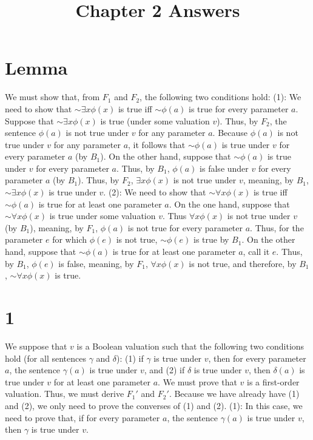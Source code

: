 \documentclass{article}
\title{Chapter 2 Answers}
\newcommand*{\oldneg}{\mathord{\sim}}
\theoremstyle{definition}
\begin{document}
\maketitle

\section*{Lemma}
We must show that, from $F_1$ and $F_2$, the following two conditions hold:\newline
(1): We need to show that $\oldneg\exists x\phi(x)$ is true iff $\oldneg\phi(a)$ is true for every parameter $a$. Suppose that $\oldneg\exists x\phi(x)$ 
is true (under some valuation $v$). Thus, by $F_2$, the sentence $\phi(a)$ is not true under $v$ for any parameter $a$. Because $\phi(a)$ is not 
true under $v$ for any parameter $a$, it follows that $\oldneg\phi(a)$ is true under $v$ for every parameter $a$ (by $B_1$). On the other hand, 
suppose that $\oldneg\phi(a)$ is true under $v$ for every parameter $a$. Thus, by $B_1$, $\phi(a)$ is false under $v$ for every parameter $a$ (by $B_1$). Thus, by $F_2$, $\exists x\phi(x)$ is not true under $v$, meaning, by $B_1$, $\oldneg\exists x\phi(x)$ is true under $v$.\newline
(2): We need to show that $\oldneg\forall x\phi(x)$ is true iff $\oldneg\phi(a)$ is true for at least one parameter $a$. On the one hand, suppose 
that $\oldneg\forall x\phi(x)$ is true under some valuation $v$. Thus $\forall x\phi(x)$ is not true under $v$ (by $B_1$), meaning, by $F_1$, 
$\phi(a)$ is not true for every parameter $a$. Thus, for the parameter $e$ for which $\phi(e)$ is not true, $\oldneg\phi(e)$ is true by $B_1$. On the 
other hand, suppose that $\oldneg\phi(a)$ is true for at least one parameter $a$, call it $e$. Thus, by $B_1$, $\phi(e)$ is false, meaning, by $F_1$, 
$\forall x\phi(x)$ is not true, and therefore, by $B_1$, $\oldneg\forall x\phi(x)$ is true.  

\section*{1}
We suppose that $v$ is a Boolean valuation such that the following two conditions hold (for all sentences $\gamma$ and $\delta$):\newline
(1) if $\gamma$ is true under $v$, then for every parameter $a$, the sentence $\gamma(a)$ is true under $v$, and\newline
(2) if $\delta$ is true under $v$, then $\delta(a)$ is true under $v$ for at least one parameter $a$.\newline
We must prove that $v$ is a first-order valuation. Thus, we must derive $F_1'$ and $F_2'$. Because we have already have (1) and (2), we only need 
to prove the converses of (1) and (2).\newline
(1): In this case, we need to prove that, if for every parameter $a$, the sentence $\gamma(a)$ is true under $v$, then $\gamma$ is true under $v$.
\end{document}
